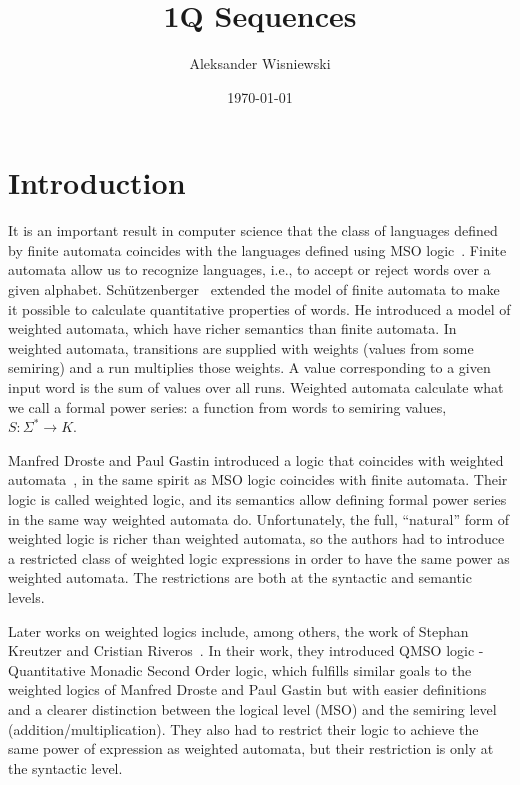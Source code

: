 \documentclass[12pt]{article}
\title{1Q Sequences}
\author{Aleksander Wisniewski}
\date{\today}
\theoremstyle{definition}
\begin{document}
\maketitle

\section{Introduction}
It is an important result in computer science that the class of languages defined by finite automata coincides with the languages defined using MSO logic~\cite{Buchi1960}. Finite automata allow us to recognize languages, i.e., to accept or reject words over a given alphabet. Sch{\"{u}}tzenberger~\cite{Schutzenberger61b} extended the model of finite automata to make it possible to calculate quantitative properties of words. He introduced a model of weighted automata, which have richer semantics than finite automata. In weighted automata, transitions are supplied with weights (values from some semiring) and a run multiplies those weights. A value corresponding to a given input word is the sum of values over all runs. Weighted automata calculate what we call a formal power series: a function from words to semiring values, $S: \Sigma^* \rightarrow K$.

Manfred Droste and Paul Gastin introduced a logic that coincides with weighted automata~\cite{DrosteG07}, in the same spirit as MSO logic coincides with finite automata. Their logic is called weighted logic, and its semantics allow defining formal power series in the same way weighted automata do. Unfortunately, the full, “natural” form of weighted logic is richer than weighted automata, so the authors had to introduce a restricted class of weighted logic expressions in order to have the same power as weighted automata. The restrictions are both at the syntactic and semantic levels.

Later works on weighted logics include, among others, the work of Stephan Kreutzer and Cristian Riveros~\cite{KreutzerR13}. In their work, they introduced QMSO logic - Quantitative Monadic Second Order logic, which fulfills similar goals to the weighted logics of Manfred Droste and Paul Gastin but with easier definitions and a clearer distinction between the logical level (MSO) and the semiring level (addition/multiplication). They also had to restrict their logic to achieve the same power of expression as weighted automata, but their restriction is only at the syntactic level.
\end{document}
